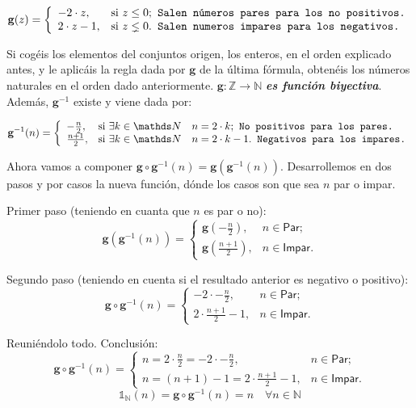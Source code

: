 \documentclass{amsart}
\theoremstyle{definition}
\theoremstyle{remark}
\numberwithin{equation}{section}
\newcommand{\setN}{\mathds N}
\newcommand{\setZ}{\mathds Z}
\newcommand{\fromto}{\longrightarrow}
\newcommand{\monrel}[1]{\mathbf{#1}}
\newcommand{\funct}[1]{\monrel{#1}}
\newcommand{\functinv}[1]{{\funct{#1}}^{-1}}
\newcommand{\functat}[2]{\funct{#1}{\left({#2}\right)}}
\newcommand{\functinvat}[2]{\functinv{#1}{\left({#2}\right)}}
\begin{document}
$$
\functat{g}{z} =
\left\{
  \begin{array}{ll}
    -2 \cdot z , & \hbox{si $z \leq 0$;} \texttt{ Salen números pares para 
    los no positivos.}\\
    2 \cdot z - 1, & \hbox{si $z \lneq 0$.} \texttt{ Salen numeros impares 
    para los negativos.}
  \end{array}
\right.
$$


Si cogéis los elementos del conjuntos origen, los enteros, en el orden 
explicado antes, y le aplicáis la regla dada por $\funct{g}$ de la última 
fórmula, obtenéis los números naturales en el orden dado anteriormente. 
$\funct{g} : \setZ \fromto \setN$ \textbf{\emph{es función biyectiva}}. 
Además, $\functinv{g}$ existe y viene dada por:


$$
\functinvat{g}{n} =
\left\{
  \begin{array}{ll}
    -\frac{n}{2} , & \hbox{si $\exists k \in \setN \quad n =  2 \cdot k $;} 
    \texttt{ No positivos para los pares.}\\
    \frac{n+1}{2}, & \hbox{si $\exists k \in \setN \quad n =  2 \cdot k-1 $.} 
    \texttt{ Negativos para los impares.}
  \end{array}
\right.
$$


	Ahora vamos a componer $\funct{g}\circ\functinvat{g}{n} = 
\functat{g}{\functinvat{g}{n}}$. Desarrollemos en dos pasos y por casos la 
nueva función, dónde los casos son que sea $n$ par o impar.


Primer paso (teniendo en cuanta que $n$ es par o no):
$$
\functat{g}{\functinvat{g}{n}} =
\left\{
  \begin{array}{ll}
    \functat{g}{-\frac{n}{2}} , & n \in \textsf{Par}\text{;}\\
    \functat{g}{\frac{n+1}{2}}, & n \in \textsf{Impar}\text{.}
  \end{array}
\right.
$$


Segundo paso (teniendo en cuenta si el resultado anterior es negativo o 
positivo):
$$
\funct{g}\circ\functinv{g}\left({n}\right) =
\left\{
  \begin{array}{ll}
    -2\cdot{-\frac{n}{2}} , & n \in \textsf{Par}\text{;}\\
    2\cdot{\frac{n+1}{2}}-1, & n \in \textsf{Impar}\text{.}
  \end{array}
\right.
$$


Reuniéndolo todo. Conclusión:
$$
\funct{g}\circ\functinv{g}\left({n}\right) =
\left\{
  \begin{array}{ll}
    n=2\cdot{\frac{n}{2}}=-2\cdot{-\frac{n}{2}} , & n \in 
    \textsf{Par}\text{;}\\
    n=(n+1)-1=2\cdot{\frac{n+1}{2}}-1, & n \in \textsf{Impar}\text{.}
  \end{array}
\right.
$$
$$
{{\mathds{1}}_{\setN}{\left({n}\right)}=
\funct{g}\circ\functinv{g}}{\left({n}\right)} = n \quad \forall n \in \setN
$$
\end{document}
